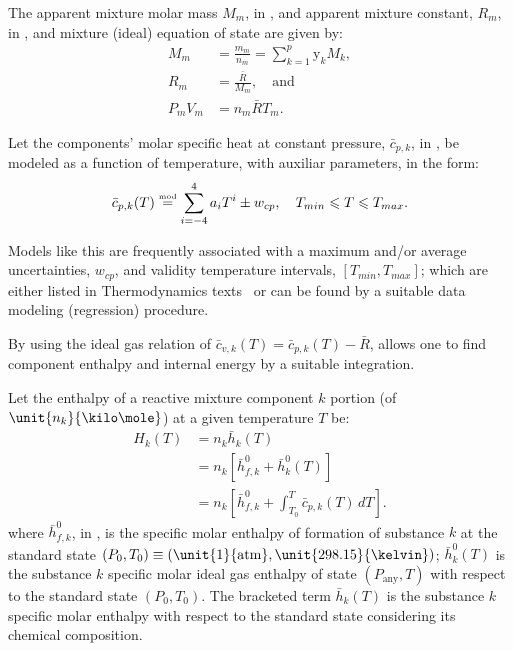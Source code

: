     The apparent mixture molar mass $M_m$, in \kilogram\per\kilo\mole, and apparent mixture constant, $R_m$, in \kilo\joule\per\kilogram\usk\kelvin, and mixture (ideal) equation of  state  are
    given by:%
    \begin{align}
        \label{eq:Mm}
        M_m         &= \frac{m_m}{n_m} = \sum_{k=1}^p \mathrm{y}_k M_k, \\
        \label{eq:Rm}
        R_m         &= \frac{\bar{R}}{M_m}, \quad\mbox{and} \\
        \label{eq:mEoS}
        P_mV_m      &= n_m\bar{R}T_m.
    \end{align}

    Let the components' molar specific heat at constant pressure, $\bar{c}_{p,k}$, in \kilo\joule\per\kilo\mole\usk\kelvin, be modeled as a function of temperature, with  auxiliar  parameters,
    in the form:%
    \begin{equation}
        \bar{c}_{p,k}(T) \stackrel{\text{{\tiny mod}}}{=} \sum_{i=-4}^4 a_iT^i \pm w_{cp}, \quad T_{min} \leqslant T \leqslant T_{max}.
        \label{eq:cp}
    \end{equation}

    Models like this are frequently associated with a maximum and/or average uncertainties, $w_{cp}$, and validity temperature intervals, $[T_{min},  T_{max}]$;  which  are  either  listed  in
    Thermodynamics texts~\cite{2014-CengelYA+BolesMA-McGrawHill, 1985-WylenG-Wiley} or can be found by a suitable data modeling (regression) procedure.

    By using the ideal gas relation of $\bar{c}_{v,k}(T) = \bar{c}_{p,k}(T) - \bar{R}$, allows one to find component enthalpy and internal energy by a suitable integration.

    Let the enthalpy of a reactive mixture component $k$ portion (of $\unit{n_k}{\kilo\mole}$) at a given temperature $T$ be:%
    \begin{align}
        H_k(T)      &= n_k\bar{h}_k(T) \nonumber\\
                    &= n_k[\bar{h}^0_{f,k} + \bar{h}^0_k(T)] \nonumber\\
                    &= n_k\left[
                        \bar{h}^0_{f,k} + \int_{T_0}^T \bar{c}_{p,k}(T)\,dT
                    \right].
        \label{eq:H.comp}
    \end{align}
    \noindent  where  $\bar{h}^0_{f,k}$,  in  \kilo\joule\per\kilo\mole,  is  the  specific  molar  enthalpy  of  formation  of  substance  $k$  at  the  standard  state  $(P_0,  T_0)   \equiv
    (\unit{1}{\mathrm{atm}}, \unit{298.15}{\kelvin})$; $\bar{h}^0_k(T)$ is the substance $k$ specific molar ideal gas enthalpy of state $(P_{\mathrm{any}}, T)$ with  respect  to  the  standard
    state $(P_0, T_0)$. The bracketed term $\bar{h}_k(T)$ is the substance $k$ specific molar enthalpy with respect to the standard state considering its chemical composition.

